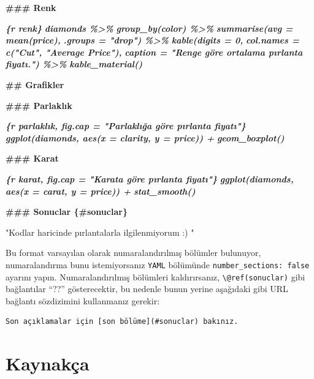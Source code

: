 \documentclass[
  oneside]{book}
\newenvironment{Shaded}{\begin{snugshade}}{\end{snugshade}}
\newcommand{\FunctionTok}[1]{\textcolor[rgb]{0.13,0.29,0.53}{\textbf{#1}}}
\newcommand{\InformationTok}[1]{\textcolor[rgb]{0.56,0.35,0.01}{\textbf{\textit{#1}}}}
\newcommand{\NormalTok}[1]{#1}
\begin{document}
\begin{Shaded}
\begin{Highlighting}[]
\FunctionTok{\#\#\# Renk}

\InformationTok{\textasciigrave{}\textasciigrave{}\textasciigrave{}\{r renk\}}
\InformationTok{diamonds \%\textgreater{}\%}
\InformationTok{  group\_by(color) \%\textgreater{}\%}
\InformationTok{  summarise(avg = mean(price),}
\InformationTok{            .groups = "drop") \%\textgreater{}\%}
\InformationTok{  kable(digits = 0, }
\InformationTok{        col.names = c("Cut", "Average Price"),}
\InformationTok{        caption = "Renge göre ortalama pırlanta fiyatı.") \%\textgreater{}\%}
\InformationTok{  kable\_material()}
\InformationTok{\textasciigrave{}\textasciigrave{}\textasciigrave{}}

\FunctionTok{\#\# Grafikler}

\FunctionTok{\#\#\# Parlaklık}

\InformationTok{\textasciigrave{}\textasciigrave{}\textasciigrave{}\{r parlaklık, fig.cap = "Parlaklığa göre pırlanta fiyatı"\}}
\InformationTok{ggplot(diamonds, aes(x = clarity, y = price)) +}
\InformationTok{  geom\_boxplot() }
\InformationTok{\textasciigrave{}\textasciigrave{}\textasciigrave{}}

\FunctionTok{\#\#\# Karat}

\InformationTok{\textasciigrave{}\textasciigrave{}\textasciigrave{}\{r karat, fig.cap = "Karata göre pırlanta fiyatı"\}}
\InformationTok{ggplot(diamonds, aes(x = carat, y = price)) +}
\InformationTok{  stat\_smooth()}
\InformationTok{\textasciigrave{}\textasciigrave{}\textasciigrave{}}

\FunctionTok{\#\#\# Sonuclar \{\#sonuclar\}}

\NormalTok{"Kodlar haricinde pırlantalarla ilgilenmiyorum :) "}
\end{Highlighting}
\end{Shaded}

Bu format varsayılan olarak numaralandırılmış bölümler bulunuyor, numaralandırma bunu istemiyorsanız \texttt{YAML} bölümünde \texttt{number\_sections:\ false} ayarını yapın. Numaralandırılmış bölümleri kaldırırsanız, \texttt{\textbackslash{}@ref(sonuclar)} gibi bağlantılar ``??'' gösterecektir, bu nedenle bunun yerine aşağıdaki gibi URL bağlantı sözdizimini kullanmanız gerekir:

\begin{verbatim}
Son açıklamalar için [son bölüme](#sonuclar) bakınız.
\end{verbatim}

\hypertarget{kaynakuxe7a}{%
\section{Kaynakça}\label{kaynakuxe7a}}
\end{document}
